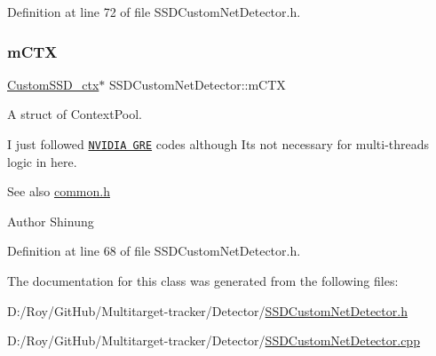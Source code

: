 Definition at line 72 of file S\+S\+D\+Custom\+Net\+Detector.\+h.

\mbox{\label{class_s_s_d_custom_net_detector_ad0d9609d8e5b22e28cae854f0ac06058}} 
\subsubsection{\texorpdfstring{m\+C\+TX}{mCTX}}
{\footnotesize\ttfamily \mbox{\hyperlink{class_s_s_d_custom_net_detector_a979c7a383a8951d8d549bdf9e1045aae}{Custom\+S\+S\+D\+\_\+ctx}}$\ast$ S\+S\+D\+Custom\+Net\+Detector\+::m\+C\+TX\hspace{0.3cm}{\ttfamily [private]}}



A struct of Context\+Pool. 

I just followed \href{https://github.com/NVIDIA/gpu-rest-engine}{\tt N\+V\+I\+D\+IA G\+RE} codes although It\textquotesingle{}s not necessary for multi-\/threads logic in here.

\begin{DoxySeeAlso}{See also}
\mbox{\hyperlink{common_8h}{common.\+h}} 
\end{DoxySeeAlso}
\begin{DoxyAuthor}{Author}
Shinung 
\end{DoxyAuthor}


Definition at line 68 of file S\+S\+D\+Custom\+Net\+Detector.\+h.



The documentation for this class was generated from the following files\+:\begin{DoxyCompactItemize}
\item 
D\+:/\+Roy/\+Git\+Hub/\+Multitarget-\/tracker/\+Detector/\mbox{\hyperlink{_s_s_d_custom_net_detector_8h}{S\+S\+D\+Custom\+Net\+Detector.\+h}}\item 
D\+:/\+Roy/\+Git\+Hub/\+Multitarget-\/tracker/\+Detector/\mbox{\hyperlink{_s_s_d_custom_net_detector_8cpp}{S\+S\+D\+Custom\+Net\+Detector.\+cpp}}\end{DoxyCompactItemize}
